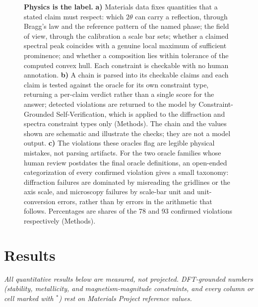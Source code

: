 \documentclass[pdflatex,sn-nature]{sn-jnl}
\begin{document}
\begin{figure}[t]
{}
\caption{\justifying\textbf{Physics is the label.} \textbf{a)} Materials data fixes quantities that a stated claim must respect: which $2\theta$ can carry a reflection, through Bragg's law and the reference pattern of the named phase; the field of view, through the calibration a scale bar sets; whether a claimed spectral peak coincides with a genuine local maximum of sufficient prominence; and whether a composition lies within tolerance of the computed convex hull. Each constraint is checkable with no human annotation. \textbf{b)} A chain is parsed into its checkable claims and each claim is tested against the oracle for its own constraint type, returning a per-claim verdict rather than a single score for the answer; detected violations are returned to the model by Constraint-Grounded Self-Verification, which is applied to the diffraction and spectra constraint types only (Methods). The chain and the values shown are schematic and illustrate the checks; they are not a model output. \textbf{c)} The violations these oracles flag are legible physical mistakes, not parsing artifacts. For the two oracle families whose human review postdates the final oracle definitions, an open-ended categorization of every confirmed violation gives a small taxonomy: diffraction failures are dominated by misreading the gridlines or the axis scale, and microscopy failures by scale-bar unit and unit-conversion errors, rather than by errors in the arithmetic that follows. Percentages are shares of the 78 and 93 confirmed violations respectively (Methods).}
\label{fig:teaser}
\end{figure}

\section*{Results}
\emph{All quantitative results below are measured, not projected. DFT-grounded
numbers (stability, metallicity, and magnetism-magnitude constraints, and every column or
cell marked with $^{*}$) rest on Materials Project reference values.}
\end{document}
